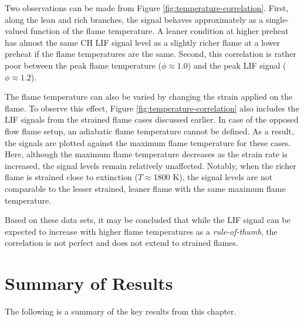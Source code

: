 

Two observations can be made from Figure \ref{fig:temperature-correlation}.
First, along the lean and rich branches, the signal behaves approximately as a single-valued function of the flame temperature.
A leaner condition at higher preheat has almost the same CH LIF signal level as a slightly richer flame at a lower preheat if the flame temperatures are the same.
Second, this correlation is rather poor between the peak flame temperature (\(\phi\approx 1.0\)) and the peak LIF signal (\(\phi\approx 1.2\)).

The flame temperature can also be varied by changing the strain applied on the flame.
To observe this effect, Figure \ref{fig:temperature-correlation} also includes the LIF signals from the strained flame cases discussed earlier.
In case of the opposed flow flame setup, an adiabatic flame temperature cannot be defined.
As a result, the signals are plotted against the maximum flame temperature for these cases.
Here, although the maximum flame temperature decreases as the strain rate is increased, the signal levels remain relatively unaffected.
Notably, when the richer flame is strained close to extinction (\(T\approx\)1800 K), the signal levels are not comparable to the lesser strained, leaner flame with the same maximum flame temperature.

Based on these data sets, it may be concluded that while the LIF signal can be expected to increase with higher flame temperatures as a \emph{rule-of-thumb}, the correlation is not perfect and does not extend to strained flames.

\section{Summary of Results}

The following is a summary of the key results from this chapter.

